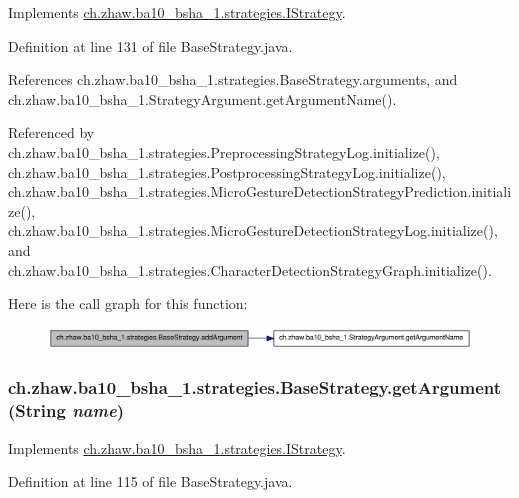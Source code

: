 Implements \hyperlink{interfacech_1_1zhaw_1_1ba10__bsha__1_1_1strategies_1_1IStrategy_a503733cf208ec99900463a36b2fea6b2}{ch.zhaw.ba10\_\-bsha\_\-1.strategies.IStrategy}.

Definition at line 131 of file BaseStrategy.java.

References ch.zhaw.ba10\_\-bsha\_\-1.strategies.BaseStrategy.arguments, and ch.zhaw.ba10\_\-bsha\_\-1.StrategyArgument.getArgumentName().

Referenced by ch.zhaw.ba10\_\-bsha\_\-1.strategies.PreprocessingStrategyLog.initialize(), ch.zhaw.ba10\_\-bsha\_\-1.strategies.PostprocessingStrategyLog.initialize(), ch.zhaw.ba10\_\-bsha\_\-1.strategies.MicroGestureDetectionStrategyPrediction.initialize(), ch.zhaw.ba10\_\-bsha\_\-1.strategies.MicroGestureDetectionStrategyLog.initialize(), and ch.zhaw.ba10\_\-bsha\_\-1.strategies.CharacterDetectionStrategyGraph.initialize().

Here is the call graph for this function:\nopagebreak
\begin{figure}[H]
\begin{center}
\leavevmode
\includegraphics[width=321pt]{classch_1_1zhaw_1_1ba10__bsha__1_1_1strategies_1_1BaseStrategy_ad106d9d501550fe475a4a01032632597_cgraph}
\end{center}
\end{figure}
\hypertarget{classch_1_1zhaw_1_1ba10__bsha__1_1_1strategies_1_1BaseStrategy_a8c113a7ead0de41b8dbd5e58d66de08e}{
\subsubsection[{getArgument}]{ ch.zhaw.ba10\_\-bsha\_\-1.strategies.BaseStrategy.getArgument (String {\em name})}}
\label{classch_1_1zhaw_1_1ba10__bsha__1_1_1strategies_1_1BaseStrategy_a8c113a7ead0de41b8dbd5e58d66de08e}


Implements \hyperlink{interfacech_1_1zhaw_1_1ba10__bsha__1_1_1strategies_1_1IStrategy_acc7ef9593926bb88c142d296332525cc}{ch.zhaw.ba10\_\-bsha\_\-1.strategies.IStrategy}.

Definition at line 115 of file BaseStrategy.java.

